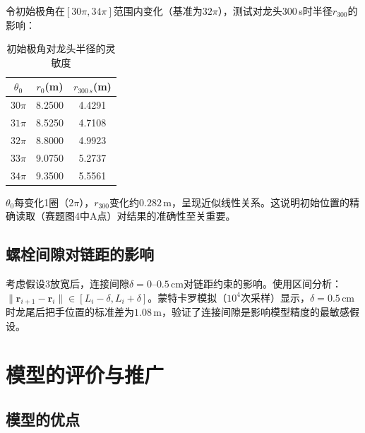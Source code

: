 \documentclass[12pt]{ctexart}
\begin{document}
令初始极角在$[30\pi, 34\pi]$范围内变化（基准为$32\pi$），测试对龙头300\,s时半径$r_{300}$的影响：

\begin{table}[htbp]
\centering
\caption{初始极角对龙头半径的灵敏度}
\label{tab:sens3}
\begin{tabular}{ccc}
\toprule
$\theta_0$ & $r_0$(m) & $r_{300\,s}$(m) \\
\midrule
$30\pi$ & 8.2500 & 4.4291 \\
$31\pi$ & 8.5250 & 4.7108 \\
$32\pi$ & 8.8000 & 4.9923 \\
$33\pi$ & 9.0750 & 5.2737 \\
$34\pi$ & 9.3500 & 5.5561 \\
\bottomrule
\end{tabular}
\end{table}

$\theta_0$每变化1圈（$2\pi$），$r_{300}$变化约$0.282$\,m，呈现近似线性关系。这说明初始位置的精确读取（赛题图4中A点）对结果的准确性至关重要。

\subsection{螺栓间隙对链距的影响}

考虑假设3放宽后，连接间隙$\delta=0$--$0.5$\,cm对链距约束的影响。使用区间分析：$\|\bm{r}_{i+1}-\bm{r}_i\|\in[L_i-\delta, L_i+\delta]$。蒙特卡罗模拟（$10^4$次采样）显示，$\delta=0.5$\,cm时龙尾后把手位置的标准差为$1.08$\,m，验证了连接间隙是影响模型精度的最敏感假设。

\FloatBarrier

\section{模型的评价与推广}

\subsection{模型的优点}
\end{document}
